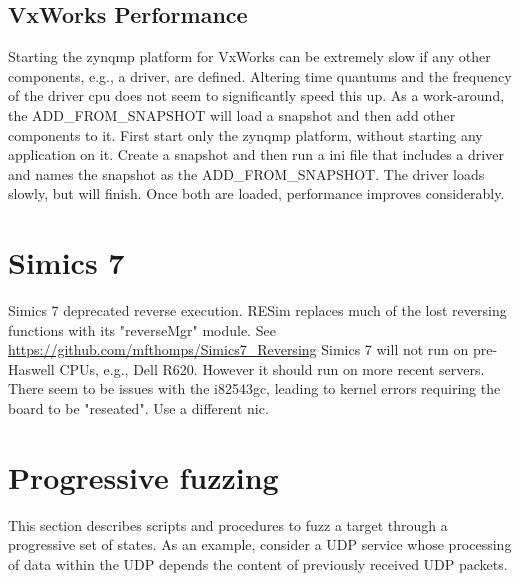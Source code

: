 \documentclass[titlepage]{article}
\begin{document}
\begin{appendices}
\subsection{VxWorks Performance}
Starting the zynqmp platform for VxWorks can be extremely slow if any other components, e.g., a driver, are defined.  Altering time quantums and the frequency of
the driver cpu does not seem to significantly speed this up.  As a work-around, the ADD\_FROM\_SNAPSHOT will load a snapshot and then add other components to it.
First start only the zynqmp platform, without starting any application on it.  Create a snapshot and then run a ini file that includes a driver and names the snapshot
as the ADD\_FROM\_SNAPSHOT.  The driver loads slowly, but will finish.  Once both are loaded, performance improves considerably.

\section{Simics 7}
Simics 7 deprecated reverse execution.  RESim replaces much of the lost reversing functions with its "reverseMgr" module.
See \url{https://github.com/mfthomps/Simics7\_Reversing}
Simics 7 will not run on pre-Haswell CPUs, e.g., Dell R620.  However it should run on more recent servers.
There seem to be issues with the i82543gc, leading to kernel errors requiring the board to be "reseated".  Use a different nic.

\section{Progressive fuzzing}
This section describes scripts and procedures to fuzz a target through a progressive set of states.
As an example, consider a UDP service whose processing of data within the UDP depends the content of previously received UDP packets.

\end{appendices}
\end{document}
